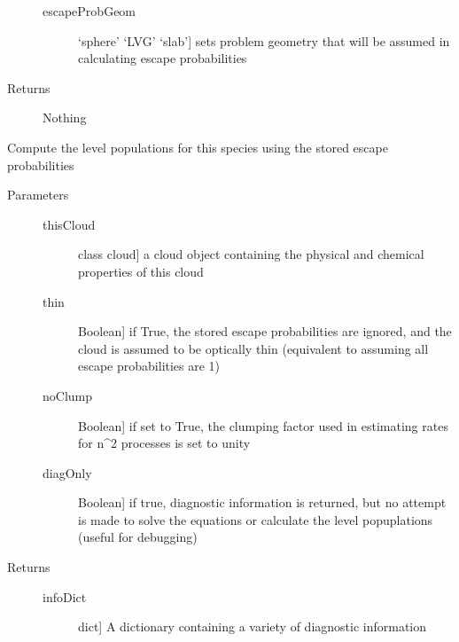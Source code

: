 \documentclass[letterpaper,10pt,english]{sphinxmanual}
\begin{document}
\begin{fulllineitems}
\begin{fulllineitems}
\begin{description}
\begin{description}
\item[{escapeProbGeom}] \leavevmode{[}`sphere' \textbar{} `LVG' \textbar{} `slab'{]}
sets problem geometry that will be assumed in calculating
escape probabilities

\end{description}

\item[{Returns}] \leavevmode
Nothing

\end{description}

\end{fulllineitems}


\begin{fulllineitems}
\label{fulldoc:despotic.emitter.setLevPop}
Compute the level populations for this species using the
stored escape probabilities
\begin{description}
\item[{Parameters}] \leavevmode\begin{description}
\item[{thisCloud}] \leavevmode{[}class cloud{]}
a cloud object containing the physical and chemical
properties of this cloud

\item[{thin}] \leavevmode{[}Boolean{]}
if True, the stored escape probabilities are ignored, and
the cloud is assumed to be optically thin (equivalent to
assuming all escape probabilities are 1)

\item[{noClump}] \leavevmode{[}Boolean{]}
if set to True, the clumping factor used in estimating
rates for n\textasciicircum{}2 processes is set to unity

\item[{diagOnly}] \leavevmode{[}Boolean{]}
if true, diagnostic information is returned, but no
attempt is made to solve the equations or calculate the
level popuplations (useful for debugging)

\end{description}

\item[{Returns}] \leavevmode\begin{description}
\item[{infoDict}] \leavevmode{[}dict{]}
A dictionary containing a variety of diagnostic
information


\end{description}
\end{description}
\end{fulllineitems}
\end{fulllineitems}
\end{document}
